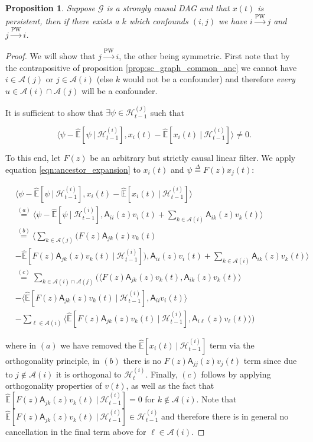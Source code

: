 \documentclass{statsoc}
\def\pwgc{\overset{\text{PW}}{\rightarrow}}  %
\def\gcg{\mathcal{G}}  %
\def\A{\mathsf{A}}  %
\def\H{\mathcal{H}}  %
\newcommand{\linE}[2]{\hat{\E}[#1\ |\ #2]}  %
\newcommand{\anc}[1]{\mathcal{A}(#1)}  %
\newtheorem{proposition}{Proposition}
\def\defeq{\overset{\Delta}{=}}  %
\def\H{\mathcal{H}}  %
\def\E{\mathbb{E}}  %
\newcommand{\inner}[2]{\langle #1, #2 \rangle}  %
\begin{document}
\begin{proposition}
  \label{prop:persistence_converse}
  Suppose $\gcg$ is a strongly causal DAG and that $x(t)$ is
  persistent, then if there exists a $k$ which confounds $(i, j)$ we
  have $i \pwgc j$ and $j \pwgc i$.
\end{proposition}
\begin{proof}
  We will show that $j \pwgc i$, the other being symmetric.  First
  note that by the contrapositive of proposition
  \ref{prop:sc_graph_common_anc} we cannot have $i \in \anc{j}$ or
  $j \in \anc{i}$ (else $k$ would not be a confounder) and therefore
  \textit{every} $u \in \anc{i}\cap\anc{j}$ will be a confounder.

  It is sufficient to show that $\exists \psi \in \H_{t - 1}^{(j)}$
  such that

  \begin{equation*}
    \inner{\psi - \linE{\psi}{\H_{t - 1}^{(i)}}}{x_i(t) - \linE{x_i(t)}{\H_{t - 1}^{(i)}}} \ne 0.
  \end{equation*}

  To this end, let $F(z)$ be an arbitrary but strictly causal linear
  filter.  We apply equation \eqref{eqn:ancestor_expansion} to
  $x_i(t)$ and $\psi \defeq F(z)x_j(t)$:

  \begin{align*}
    &\inner{\psi - \linE{\psi}{\H_{t - 1}^{(i)}}}{x_i(t) - \linE{x_i(t)}{\H_{t - 1}^{(i)}}}\\
    &\overset{(a)}{=} \inner{\psi - \linE{\psi}{\H_{t - 1}^{(i)}}}{\A_{ii}(z)v_i(t) + \sum_{k \in \anc{i}}\A_{ik}(z)v_k(t)}\\
    &\overset{(b)}{=} \inner{\sum_{k \in \anc{j}}\big(F(z)\A_{jk}(z)v_k(t) \\&- \linE{F(z)\A_{jk}(z)v_k(t)}{\H_{t - 1}^{(i)}}\big)}{\A_{ii}(z)v_i(t) + \sum_{k \in \anc{i}}\A_{ik}(z)v_k(t)}\\
    &\overset{(c)}{=} \sum_{k \in \anc{i}\cap\anc{j}}\Big(\inner{F(z)\A_{jk}(z)v_k(t)}{\A_{ik}(z)v_k(t)} \\&- \inner{\linE{F(z)\A_{jk}(z)v_k(t)}{\H_{t - 1}^{(i)}}}{\A_{ii}v_i(t)}\\
    &- \sum_{\ell \in \anc{i}}\inner{\linE{F(z)\A_{jk}(z)v_k(t)}{\H_{t - 1}^{(i)}}}{\A_{i\ell}(z)v_\ell(t)}\Big)
  \end{align*}

  where in $(a)$ we have removed the $\linE{x_i(t)}{\H_{t - 1}^{(i)}}$
  term via the orthogonality principle, in $(b)$ there is no
  $F(z)\A_{jj}(z)v_j(t)$ term since due to $j \not\in \anc{i}$ it is
  orthogonal to $\H_t^{(i)}$.  Finally, $(c)$ follows by applying
  orthogonality properties of $v(t)$, as well as the fact that
  $\linE{F(z)\A_{jk}(z)v_k(t)}{\H_{t - 1}^{(i)}} = 0$ for
  $k \not \in \anc{i}$.  Note that
  $\linE{F(z)\A_{jk}(z)v_k(t)}{\H_{t - 1}^{(i)}} \in \H_{t - 1}^{(i)}$
  and therefore there is in general no cancellation in the final term
  above for $\ell \in \anc{i}$.


\end{proof}
\end{document}
